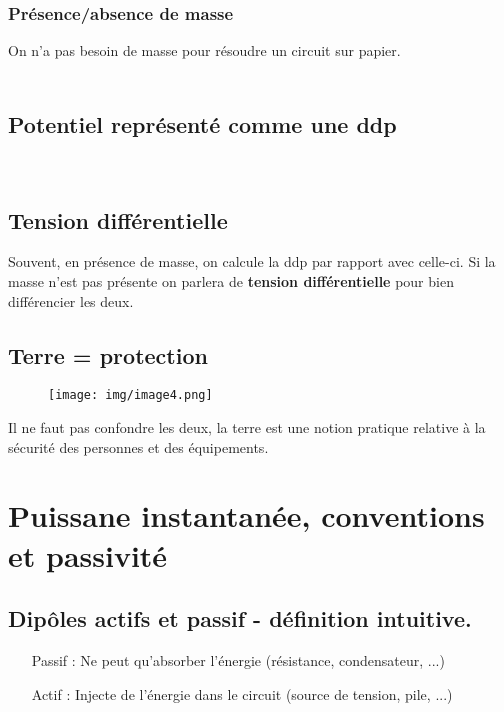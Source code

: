 \documentclass[11pt, a4paper, openany]{book}
\begin{document}
		\subsubsection{Présence/absence de masse}
		On n'a pas besoin de masse pour résoudre un circuit sur papier.\\
		\ \\
		
		\subsection{Potentiel représenté comme une ddp}
		\ \\
		
		\subsection{Tension différentielle}
		Souvent, en présence de masse, on calcule la ddp par rapport avec celle-ci. Si la masse n'est pas présente on parlera de \textbf{tension différentielle} pour bien différencier les deux.
		
		\subsection{Terre = protection}
		\begin{wrapfigure}[5]{r}{2.5cm}
			\texttt{[image: img/image4.png]}
		\end{wrapfigure}
		Il ne faut pas confondre les deux, la terre est une notion pratique relative à la sécurité des personnes et des équipements.
		
		\section{Puissane instantanée, conventions et passivité}
		\subsection{Dipôles actifs et passif - définition intuitive.}
		\begin{itemize}
			\item[Passif] : Ne peut qu'absorber l'énergie (résistance, condensateur, ...)
			\item[Actif] : Injecte de l'énergie dans le circuit (source de tension, pile, ...)
		\end{itemize}
		
\end{document}
